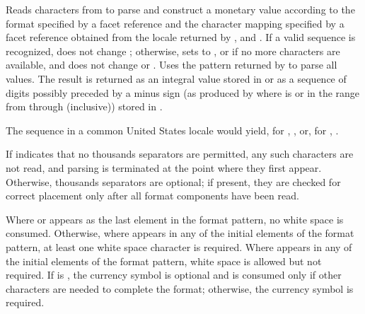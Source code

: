 \begin{itemdescr}
\pnum
\effects
Reads characters from
to parse and construct a monetary value according to the
format specified by a
facet reference
and the character mapping specified by a
facet reference
obtained from the locale returned by
,
and
.
If a valid sequence is recognized,
does not change ;
otherwise, sets  to
,
or
if no more characters are available,
and does not change  or .
Uses the pattern returned by
to parse all values.
The result is returned as an integral value stored in
or as a sequence of digits possibly preceded by a minus sign
(as produced by
where
is
or in the range from
through
(inclusive))
stored in
.
\begin{example}
The sequence
in a common United States locale would yield, for
,
,
or, for
,
.
\end{example}
If
indicates that no thousands separators are permitted,
any such characters are not read, and parsing is terminated at the point
where they first appear.
Otherwise, thousands separators are optional;
if present, they are checked for correct placement only after
all format components have been read.

\pnum
Where
or
appears as the last element in the format pattern,
no white space is consumed. Otherwise, where  appears in any of the
initial elements of the format pattern, at least one white space character is required. Where
 appears in any of the initial elements of the format pattern, white
space is allowed but not required.
If
is , the currency symbol is optional and is consumed only if
other characters are needed to complete the format;
otherwise, the currency symbol is required.


\end{itemdescr}
